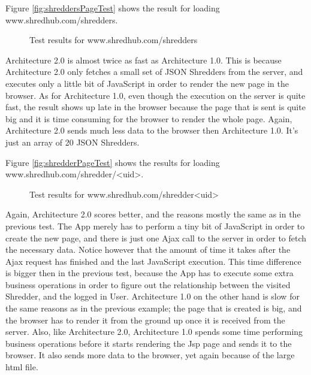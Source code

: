 Figure \vref{fig:shreddersPageTest} shows the result for loading 
www.shredhub.com/shredders.
\begin{figure}
\begin{center}
\end{center}
\caption{Test results for www.shredhub.com/shredders}\label{fig:shreddersPageTest}
\end{figure}
Architecture 2.0 is almost twice as fast as Architecture 1.0. This is because Architecture 2.0 only fetches a small set of JSON Shredders from the server, and executes only a little bit of JavaScript in order to render the new page in the browser.  As for Architecture 1.0, even though the execution on the server is quite fast, the result shows up late in the browser  because the page that is sent is quite big and it is time consuming for the browser to render the whole page. Again, Architecture 2.0 sends much less data to the browser then Architecture 1.0. It's just an array of 20 JSON Shredders.

Figure \vref{fig:shredderPageTest} shows the results for loading 
www.shredhub.com/shredder/<uid>.
\begin{figure}
\begin{center}
\end{center}
\caption{Test results for www.shredhub.com/shredder<uid>}\label{fig:shredderPageTest}
\end{figure}
Again, Architecture 2.0 scores better, and the reasons mostly the same as in the previous test. The App merely has to perform a tiny bit of JavaScript in order to create the new page, and there is just one Ajax call to the server in order to fetch the necessary data. Notice however that the amount of time it takes after the Ajax request has finished and the last JavaScript execution. This time difference is bigger then in the previous test, because the App has to execute some extra business operations in order to figure out the relationship between the visited Shredder, and the logged in User. Architecture 1.0 on the other hand is slow for the same reasons as in the previous example; the page that is created is big, and the browser has to render it from the ground up once it is received from the server. Also, like Architecture 2.0, Architecture 1.0 spends some time performing business operations before it starts rendering the Jsp page and sends it to the browser. It also sends more data to the browser, yet again because of the large html file. 


